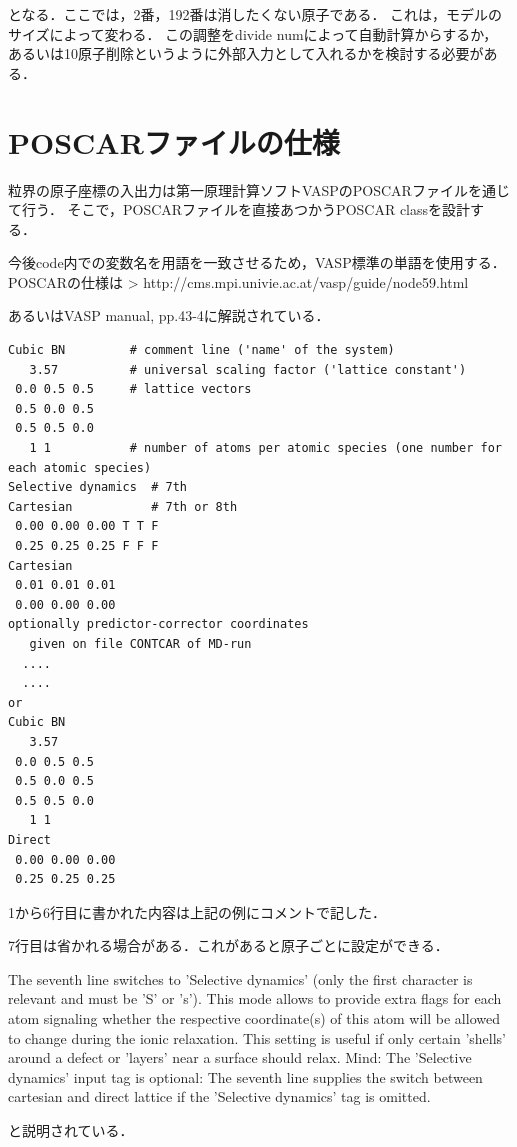 となる．ここでは，2番，192番は消したくない原子である．
これは，モデルのサイズによって変わる． この調整をdivide
numによって自動計算からするか，
あるいは10原子削除というように外部入力として入れるかを検討する必要がある．

    \section{POSCARファイルの仕様}\label{poscarux30d5ux30a1ux30a4ux30ebux306eux4ed5ux69d8}

粒界の原子座標の入出力は第一原理計算ソフトVASPのPOSCARファイルを通じて行う．
そこで，POSCARファイルを直接あつかうPOSCAR classを設計する．

今後code内での変数名を用語を一致させるため，VASP標準の単語を使用する．
POSCARの仕様は \textgreater{}
http://cms.mpi.univie.ac.at/vasp/guide/node59.html

あるいはVASP manual, pp.43-4に解説されている．

\begin{verbatim}
Cubic BN         # comment line ('name' of the system)
   3.57          # universal scaling factor ('lattice constant')
 0.0 0.5 0.5     # lattice vectors
 0.5 0.0 0.5  
 0.5 0.5 0.0
   1 1           # number of atoms per atomic species (one number for each atomic species)
Selective dynamics  # 7th
Cartesian           # 7th or 8th
 0.00 0.00 0.00 T T F
 0.25 0.25 0.25 F F F
Cartesian
 0.01 0.01 0.01
 0.00 0.00 0.00
optionally predictor-corrector coordinates 
   given on file CONTCAR of MD-run
  ....
  ....
or
Cubic BN
   3.57
 0.0 0.5 0.5
 0.5 0.0 0.5
 0.5 0.5 0.0
   1 1
Direct
 0.00 0.00 0.00 
 0.25 0.25 0.25
\end{verbatim}

1から6行目に書かれた内容は上記の例にコメントで記した．

7行目は省かれる場合がある．これがあると原子ごとに設定ができる．

The seventh line switches to 'Selective dynamics' (only the first
character is relevant and must be 'S' or 's'). This mode allows to
provide extra flags for each atom signaling whether the respective
coordinate(s) of this atom will be allowed to change during the ionic
relaxation. This setting is useful if only certain 'shells' around a
defect or 'layers' near a surface should relax. Mind: The 'Selective
dynamics' input tag is optional: The seventh line supplies the switch
between cartesian and direct lattice if the 'Selective dynamics' tag is
omitted.

と説明されている．

